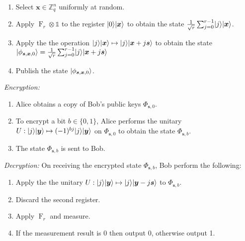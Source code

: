 \documentclass[11pt]{article}
\theoremstyle{plain}
\theoremstyle{definition}
\DeclareMathOperator{\qft}{F}
\DeclarePairedDelimiter{\ldbrac}{\lvert}{\rangle}
\def\Z{\ensuremath{\mathbb{Z}}}
\begin{document}
\begin{enumerate}[topsep = 1pt, itemsep = 1pt, parsep = 1pt]
\item Select $\bm{x} \in \Z_q^n$ uniformly at random.
\item Apply $\qft_r \otimes \mathds{1}$ to the register $\ldbrac{0} \ldbrac{\bm{x}}$ to obtain the state $\frac{1}{\sqrt{r}} \sum_{j = 0}^{r - 1} \ldbrac{j} \ldbrac{\bm{x}}$.
\item Apply the the operation $\ldbrac{j}\ldbrac{\bm{x}} \mapsto \ldbrac{j}\ldbrac{\bm{x} + j\bm{s}}$ to obtain the state $\ldbrac{\phi_{\bm{s}, \bm{x}, 0}} = \frac{1}{\sqrt{r}} \sum_{j = 0}^{r - 1} \ldbrac{j} \ldbrac{\bm{x} + j\bm{s}}$
\item Publish the state $\ldbrac{\phi_{\bm{s}, \bm{x}, 0}}$.     
\end{enumerate}

\vspace*{5mm}

\textit{Encryption:}

\begin{enumerate}[topsep = 1pt, itemsep = 1pt, parsep = 1pt]
\item Alice obtains a copy of Bob's public keys $\Phi_{\bm{s}, 0}$.
\item To encrypt a bit $b \in \{ 0, 1 \}$, Alice performs the unitary $U: \ldbrac{j}\ldbrac{\bm{y}} \mapsto (-1)^{bj}\ldbrac{j}\ldbrac{\bm{y}}$ on $\Phi_{\bm{s}, 0}$ to obtain the state $\Phi_{\bm{s}, b}$.
\item The state $\Phi_{\bm{s}, b}$ is sent to Bob.
\end{enumerate}

\vspace*{5mm}

\textit{Decryption:}
On receiving the encrypted state $\Phi_{\bm{s}, b}$, Bob perform the following:
\begin{enumerate}[topsep = 1pt, itemsep = 1pt, parsep = 1pt]
\item Apply the the unitary $U: \ldbrac{j}\ldbrac{\bm{y}} \mapsto \ldbrac{j}\ldbrac{\bm{y} - j\bm{s}}$ to $\Phi_{\bm{s}, b}$.
\item Discard the second register.
\item Apply $\qft_r$ and measure.
\item If the measurement result is 0 then output 0, otherwise output 1.
\end{enumerate}
\end{document}
